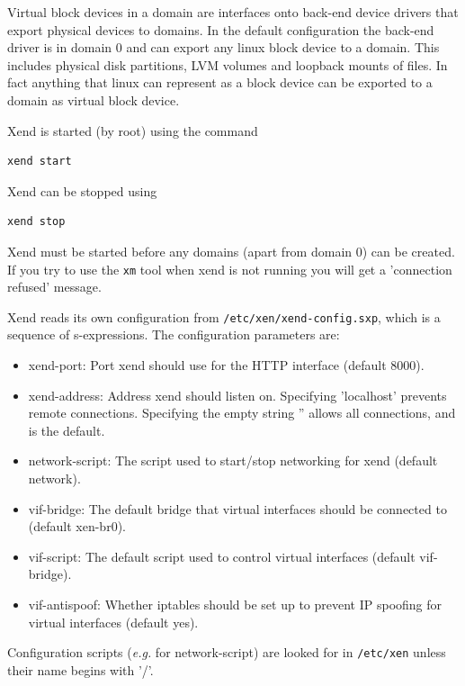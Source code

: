 \documentclass[11pt,twoside,final,openright]{xenstyle}
\begin{document}
Virtual block devices in a domain are interfaces onto back-end device drivers
that export physical devices to domains. In the default configuration the back-end
driver is in domain 0 and can export any linux block device to a domain. This includes
physical disk partitions, LVM volumes and loopback mounts of files. In fact anything
that linux can represent as a block device can be exported to a domain as virtual
block device.

Xend is started (by root) using the command
\begin{verbatim}
xend start
\end{verbatim}
Xend can be stopped using
\begin{verbatim}
xend stop
\end{verbatim}
Xend must be started before any domains (apart from domain 0) can be created.
If you try to use the {\tt xm} tool when xend is not running you will get a
'connection refused' message.

Xend reads its own configuration from {\tt /etc/xen/xend-config.sxp}, which is
a sequence of s-expressions. The configuration parameters are:
\begin{itemize}

\item xend-port: Port xend should use for the HTTP interface (default 8000).

\item xend-address: Address xend should listen on.
  Specifying 'localhost' prevents remote connections.
  Specifying the empty string '' allows all connections, and is the default.

\item network-script: The script used to start/stop networking for xend (default network).

\item vif-bridge: The default bridge that virtual interfaces should be connected to
  (default xen-br0).

\item vif-script: The default script used to control virtual interfaces
  (default vif-bridge).

\item vif-antispoof: Whether iptables should be set up to prevent IP spoofing for
  virtual interfaces (default yes).
\end{itemize}

Configuration scripts ({\it e.g.} for network-script) are looked for in {\tt /etc/xen}
unless their name begins with '/'.
\end{document}
